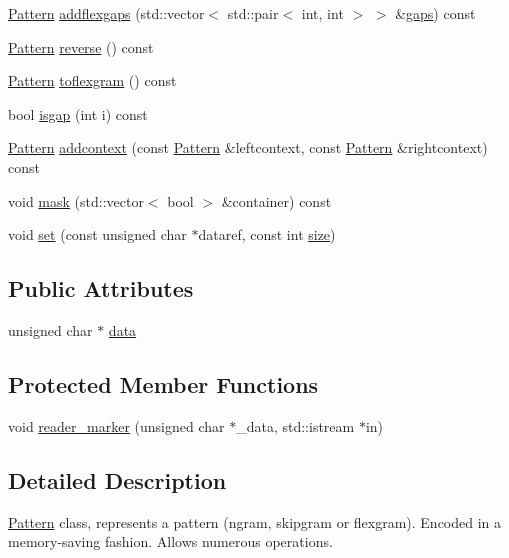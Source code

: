 \begin{DoxyCompactItemize}
\hyperlink{classPattern}{Pattern} \hyperlink{classPattern_a043a073515f0a5c7a11492f9f47b2e55}{addflexgaps} (std\+::vector$<$ std\+::pair$<$ int, int $>$ $>$ \&\hyperlink{classPattern_ad4dd286b352c7e5e66dd73233b0d6b29}{gaps}) const 
\item 
\hyperlink{classPattern}{Pattern} \hyperlink{classPattern_a15e028c7c47223bec756f9a50c9d3fd0}{reverse} () const 
\item 
\hyperlink{classPattern}{Pattern} \hyperlink{classPattern_a542295a795ff5a906044dd9b6b550f0e}{toflexgram} () const 
\item 
bool \hyperlink{classPattern_a971a055b02cf2c7d6f0c6a5a0e4401f0}{isgap} (int i) const 
\item 
\hyperlink{classPattern}{Pattern} \hyperlink{classPattern_ae9b514ce75a9e8a32407684167b8ce99}{addcontext} (const \hyperlink{classPattern}{Pattern} \&leftcontext, const \hyperlink{classPattern}{Pattern} \&rightcontext) const 
\item 
void \hyperlink{classPattern_a1388ffcf485ba7a32417e6a442338f44}{mask} (std\+::vector$<$ bool $>$ \&container) const 
\item 
void \hyperlink{classPattern_afc9539da36985d942552620ea2f26525}{set} (const unsigned char $\ast$dataref, const int \hyperlink{classPattern_a400a18c6a1b6de3eb574b6a0f12c9ca2}{size})
\end{DoxyCompactItemize}
\subsection*{Public Attributes}
\begin{DoxyCompactItemize}
\item 
unsigned char $\ast$ \hyperlink{classPattern_a2e20f4d132daff981db27bb13d3ff2b5}{data}
\end{DoxyCompactItemize}
\subsection*{Protected Member Functions}
\begin{DoxyCompactItemize}
\item 
void \hyperlink{classPattern_a81cbadcd914912e5ea61a2aadd6f4fc0}{reader\+\_\+marker} (unsigned char $\ast$\+\_\+data, std\+::istream $\ast$in)
\end{DoxyCompactItemize}


\subsection{Detailed Description}
\hyperlink{classPattern}{Pattern} class, represents a pattern (ngram, skipgram or flexgram). Encoded in a memory-\/saving fashion. Allows numerous operations. 

